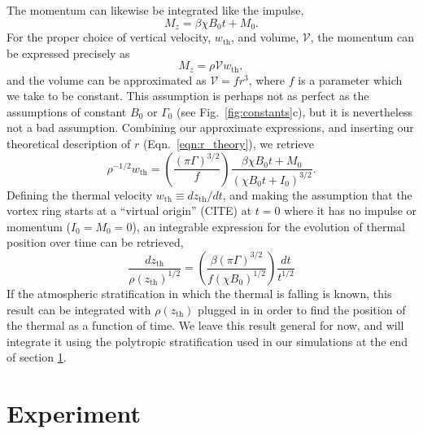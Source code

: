 \documentclass[twocolumn, amsmath, amsfonts, amssymb, trackchanges]{aastex62}
\begin{document}
The momentum can likewise be integrated like the impulse,
\begin{equation*}
M_z = \beta\chi B_0 t + M_0.
\end{equation*}
For the proper choice of vertical velocity, $w_{\text{th}}$, and volume, $\mathcal{V}$, the
momentum can be expressed precisely as 
\begin{equation*}
M_z = \rho \mathcal{V} w_{\text{th}},
\end{equation*}
and the volume can be approximated as $\mathcal{V} = f r^3$, where $f$ is a parameter
which we take to be constant. This assumption is perhaps not as perfect as the
assumptions of constant $B_0$ or $\Gamma_0$ (see Fig.~\ref{fig:constants}c), but
it is nevertheless not a bad assumption. Combining our approximate expressions,
and inserting our theoretical description of $r$ (Eqn.~\ref{eqn:r_theory}),
we retrieve
\begin{equation}
\rho^{-1/2} w_{\text{th}} = \left(\frac{(\pi \Gamma)^{3/2}}{f}\right)\frac{\beta\chi B_0 t + M_0}{(\chi B_0 t + I_0)^{3/2}}.
\end{equation}
Defining the thermal velocity $w_{\text{th}} \equiv dz_{\text{th}}/dt$, and making the
assumption that the vortex ring starts at a ``virtual origin'' (CITE) at $t = 0$ where
it has no impulse or momentum ($I_0 = M_0 = 0$), an integrable expression for the evolution
of thermal position over time can be retrieved,
\begin{equation}
\frac{dz_{\text{th}}}{\rho(z_{\text{th}})^{1/2}} =
\left(\frac{\beta(\pi\Gamma)^{3/2}}{f(\chi B_0)^{1/2}}\right)\frac{dt}{t^{1/2}}
\label{eqn:dz_theory}
\end{equation}
If the atmospheric stratification in which the thermal is falling is known, this
result can be integrated with $\rho(z_{\text{th}})$ plugged in in order to
find the position of the thermal as a function of time. We leave this result
general for now, and will integrate it using the polytropic stratification used in
our simulations at the end of section \ref{sec:experiment}.


\section{Experiment} 
\label{sec:experiment}
\end{document}
